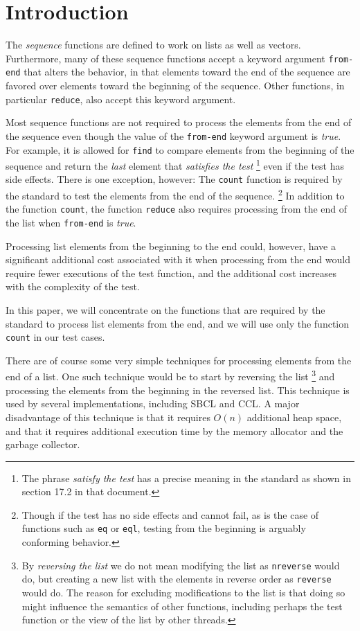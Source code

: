\section{Introduction}

The \commonlisp{} \emph{sequence} functions are defined to work on
lists as well as vectors.  Furthermore, many of these sequence
functions accept a keyword argument \texttt{from-end} that alters the
behavior, in that elements toward the end of the sequence are favored
over elements toward the beginning of the sequence.  Other functions,
in particular \texttt{reduce}, also accept this keyword argument.

Most sequence functions are not required to process the elements from
the end of the sequence even though the value of the \texttt{from-end}
keyword argument is \emph{true}.  For example, it is allowed for
\texttt{find} to compare elements from the beginning of the sequence
and return the \emph{last} element that \emph{satisfies the test}%
\footnote{The phrase \emph{satisfy the test} has a precise meaning in
  the \commonlisp{} standard as shown in section 17.2 in that
  document.}  even if the test has side effects.  There is one
exception, however: The \texttt{count} function is required by the
standard to test the elements from the end of the sequence.%
\footnote{Though if the test has no side effects and cannot fail, as
  is the case of functions such as \texttt{eq} or \texttt{eql},
  testing from the beginning is arguably conforming behavior.}
In addition to the function \texttt{count}, the function
\texttt{reduce} also requires processing from the end of the list when
\texttt{from-end} is \emph{true}.

Processing list elements from the beginning to the end could, however,
have a significant additional cost associated with it when processing
from the end would require fewer executions of the test function, and
the additional cost increases with the complexity of the test.

In this paper, we will concentrate on the functions that are required
by the standard to process list elements from the end, and we will use
only the function \texttt{count} in our test cases.

There are of course some very simple techniques for processing elements
from the end of a list.
One such technique would be to start by reversing the list%
\footnote{By \emph{reversing the list} we do not mean modifying the
  list as \texttt{nreverse} would do, but creating a new list with the
  elements in reverse order as \texttt{reverse} would do.  The reason
  for excluding modifications to the list is that doing so might
  influence the semantics of other functions, including perhaps the
  test function or the view of the list by other threads.}  and
processing the elements from the beginning in the reversed list.  This
technique is used by several implementations, including SBCL and CCL.
A major disadvantage of this technique is that it requires $O(n)$
additional heap space, and that it requires additional execution time
by the memory allocator and the garbage collector.

